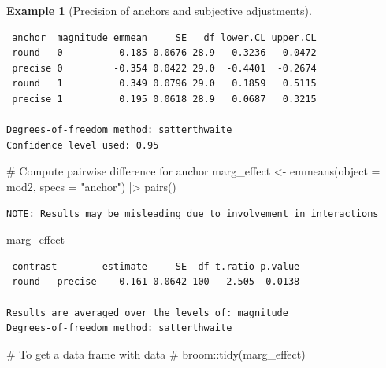 \documentclass[
  11pt,
  letterpaper,
]{scrbook}
\newenvironment{Shaded}{\begin{snugshade}}{\end{snugshade}}
\newcommand{\AttributeTok}[1]{\textcolor[rgb]{0.40,0.45,0.13}{#1}}
\newcommand{\CommentTok}[1]{\textcolor[rgb]{0.37,0.37,0.37}{#1}}
\newcommand{\FunctionTok}[1]{\textcolor[rgb]{0.28,0.35,0.67}{#1}}
\newcommand{\NormalTok}[1]{\textcolor[rgb]{0.00,0.23,0.31}{#1}}
\newcommand{\OtherTok}[1]{\textcolor[rgb]{0.00,0.23,0.31}{#1}}
\newcommand{\SpecialCharTok}[1]{\textcolor[rgb]{0.37,0.37,0.37}{#1}}
\newcommand{\StringTok}[1]{\textcolor[rgb]{0.13,0.47,0.30}{#1}}
\theoremstyle{definition}
\theoremstyle{definition}
\newtheorem{example}{Example}[chapter]
\theoremstyle{remark}
\begin{document}
\begin{example}[Precision of anchors and subjective
adjustments]
\begin{verbatim}
 anchor  magnitude emmean     SE   df lower.CL upper.CL
 round   0         -0.185 0.0676 28.9  -0.3236  -0.0472
 precise 0         -0.354 0.0422 29.0  -0.4401  -0.2674
 round   1          0.349 0.0796 29.0   0.1859   0.5115
 precise 1          0.195 0.0618 28.9   0.0687   0.3215

Degrees-of-freedom method: satterthwaite 
Confidence level used: 0.95 
\end{verbatim}

\begin{Shaded}
\begin{Highlighting}[]
\CommentTok{\# Compute pairwise difference for anchor}
\NormalTok{marg\_effect }\OtherTok{\textless{}{-}} \FunctionTok{emmeans}\NormalTok{(}\AttributeTok{object =}\NormalTok{ mod2, }
        \AttributeTok{specs =} \StringTok{"anchor"}\NormalTok{) }\SpecialCharTok{|\textgreater{}} 
  \FunctionTok{pairs}\NormalTok{()}
\end{Highlighting}
\end{Shaded}

\begin{verbatim}
NOTE: Results may be misleading due to involvement in interactions
\end{verbatim}

\begin{Shaded}
\begin{Highlighting}[]
\NormalTok{marg\_effect}
\end{Highlighting}
\end{Shaded}

\begin{verbatim}
 contrast        estimate     SE  df t.ratio p.value
 round - precise    0.161 0.0642 100   2.505  0.0138

Results are averaged over the levels of: magnitude 
Degrees-of-freedom method: satterthwaite 
\end{verbatim}

\begin{Shaded}
\begin{Highlighting}[]
\CommentTok{\# To get a data frame with data}
\CommentTok{\# broom::tidy(marg\_effect)}
\end{Highlighting}
\end{Shaded}


\end{example}
\end{document}
